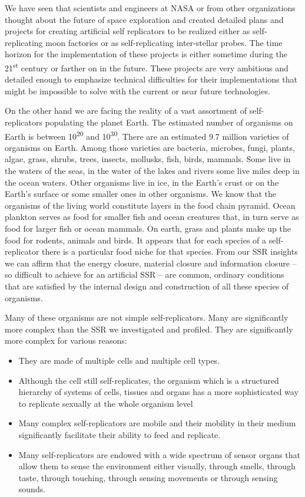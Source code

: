 We have seen that scientists and engineers at NASA or from other
organizations thought about the future of space exploration and created
detailed plans and projects for creating artificial self replicators to
be realized either as self-replicating moon factories or as
self-replicating inter-stellar probes.  The time horizon for the
implementation of these projects is either sometime during the
21\textsuperscript{st} century or farther on in the future. These
projects are very ambitious and detailed enough to emphasize technical
difficulties for their implementations that might be impossible to
solve with the current or near future technologies.

On the other hand we are facing the reality of a vast assortment of
self-replicators populating the planet Earth. The estimated number of
organisms on Earth is between 10\textsuperscript{20} and
10\textsuperscript{30}. There are an estimated 9.7 million varieties of
organisms on Earth. Among those varieties are bacteria, microbes,
fungi, plants, algae, grass, shrubs, trees, insects, mollusks, fish,
birds, mammals. Some live in the waters of the seas, in the water of
the lakes and rivers some live miles deep in the ocean waters. Other
organisms live in ice, in the Earth’s crust or on the Earth’s surface
or some smaller ones in other organisms. We know that the organisms of
the living world constitute layers in the food chain pyramid. Ocean
plankton serves as food for smaller fish and ocean creatures that, in
turn serve as food for larger fish or ocean mammals. On earth, grass
and plants make up the food for rodents, animals and birds. It appears
that for each species of a self-replicator there is a particular food
niche for that species. From our SSR insights we can affirm that the
energy closure, material closure and information closure – so difficult
to achieve for an artificial SSR – are common, ordinary conditions that
are satisfied by the internal design and construction of all these
species of organisms.

Many of these organisms are not simple self-replicators. Many are
significantly more complex than the SSR we investigated and profiled.
They are significantly more complex for various reasons:

\begin{itemize}
\item They are made of multiple cells and multiple cell types. 
\item Although the cell still self-replicates, the organism which is a
structured hierarchy of systems of cells, tissues and organs has a more
sophisticated way to replicate sexually at the whole organism level 
\item Many complex self-replicators are mobile and their mobility in
their medium significantly facilitate their ability to feed and
replicate.
\item Many self-replicators are endowed with a wide spectrum of sensor
organs that allow them to sense the environment either visually,
through smells, through taste, through touching, through sensing
movements or through sensing sounds.
\end{itemize}

